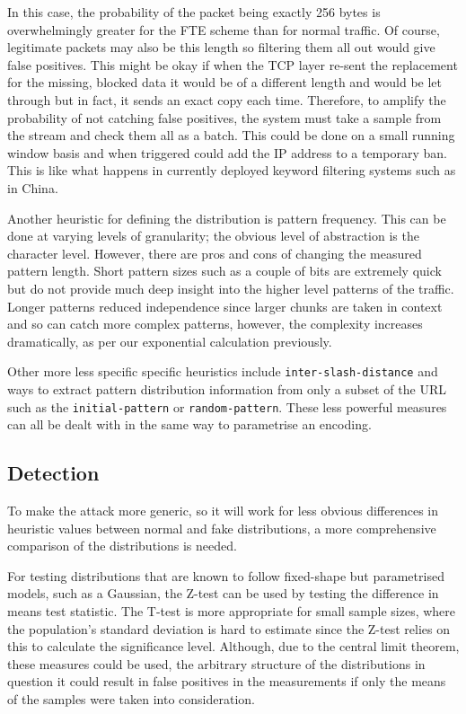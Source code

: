\documentclass[ %
                    author={Samuel Russell},
                supervisor={Prof. Bogdan Warinschi},
                    degree={MEng},
                     title={Innocuous Ciphertexts},
                  subtitle={The DE-CENSOR Scheme},
                      type={research},
                      year={2018} ]{dissertation}
\begin{document}
In this case, the probability of the packet being exactly 256 bytes is overwhelmingly greater for the FTE scheme than for normal traffic.
Of course, legitimate packets may also be this length so filtering them all out would give false positives.
This might be okay if when the TCP layer re-sent the replacement for the missing, blocked data it would be of a different length and would be let through but in fact, it sends an exact copy each time.
Therefore, to amplify the probability of not catching false positives, the system must take a sample from the stream and check them all as a batch.
This could be done on a small running window basis and when triggered could add the IP address to a temporary ban.
This is like what happens in currently deployed keyword filtering systems such as in China.

Another heuristic for defining the distribution is pattern frequency.
This can be done at varying levels of granularity; the obvious level of abstraction is the character level. However, there are pros and cons of changing the measured pattern length.
Short pattern sizes such as a couple of bits are extremely quick but do not provide much deep insight into the higher level patterns of the traffic.
Longer patterns reduced independence since larger chunks are taken in context and so can catch more complex patterns, however, the complexity increases dramatically, as per our exponential calculation previously.

Other more less specific specific heuristics include \texttt{inter-slash-distance} and ways to extract pattern distribution information from only a subset of the URL such as the \texttt{initial-pattern} or \texttt{random-pattern}. These less powerful measures can all be dealt with in the same way to parametrise an encoding.

\subsection{Detection}

To make the attack more generic, so it will work for less obvious differences in heuristic values between normal and fake distributions, a more comprehensive comparison of the distributions is needed.

For testing distributions that are known to follow fixed-shape but parametrised models, such as a Gaussian, the Z-test can be used by testing the difference in means test statistic.
The T-test is more appropriate for small sample sizes, where the population's standard deviation is hard to estimate since the Z-test relies on this to calculate the significance level.
Although, due to the central limit theorem, these measures could be used, the arbitrary structure of the distributions in question it could result in false positives in the measurements if only the means of the samples were taken into consideration.
\end{document}
